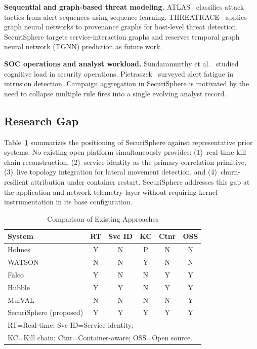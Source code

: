 \documentclass[conference]{IEEEtran}
\begin{document}
\textbf{Sequential and graph-based threat modeling.}
ATLAS~\cite{atlas2021} classifies attack tactics from alert sequences using
sequence learning. THREATRACE~\cite{threatrace2022} applies graph neural
networks to provenance graphs for host-level threat detection. SecuriSphere
targets service-interaction graphs and reserves temporal graph neural
network (TGNN) prediction as future work.

\textbf{SOC operations and analyst workload.}
Sundaramurthy et al.~\cite{sundaramurthy2014} studied cognitive load in
security operations. Pietraszek~\cite{pietraszek2005} surveyed alert
fatigue in intrusion detection. Campaign aggregation in SecuriSphere is
motivated by the need to collapse multiple rule fires into a single
evolving analyst record.

\subsection{Research Gap}
Table~\ref{tab:related} summarizes the positioning of SecuriSphere against
representative prior systems. No existing open platform simultaneously
provides: (1)~real-time kill chain reconstruction, (2)~service identity as
the primary correlation primitive, (3)~live topology integration for lateral
movement detection, and (4)~churn-resilient attribution under container
restart. SecuriSphere addresses this gap at the application and network
telemetry layer without requiring kernel instrumentation in its base
configuration.

\begin{table}[!t]
\caption{Comparison of Existing Approaches}
\label{tab:related}
\centering
\small
\begin{tabular}{lccccc}
\toprule
\textbf{System} & \textbf{RT} & \textbf{Svc ID} & \textbf{KC} & \textbf{Ctnr} & \textbf{OSS} \\
\midrule
Holmes~\cite{holmes2019}    & Y & N & P & N & N \\
WATSON~\cite{watson2021}    & N & N & Y & N & N \\
Falco~\cite{falco2019}      & Y & N & N & Y & Y \\
Hubble~\cite{hubble2020}    & Y & Y & N & Y & Y \\
MulVAL~\cite{mulval2006}    & N & N & N & N & Y \\
SecuriSphere (proposed)     & Y & Y & Y & Y & Y \\
\bottomrule
\multicolumn{6}{l}{\footnotesize RT=Real-time; Svc ID=Service identity;} \\
\multicolumn{6}{l}{\footnotesize KC=Kill chain; Ctnr=Container-aware; OSS=Open source.}
\end{tabular}
\end{table}
\end{document}

